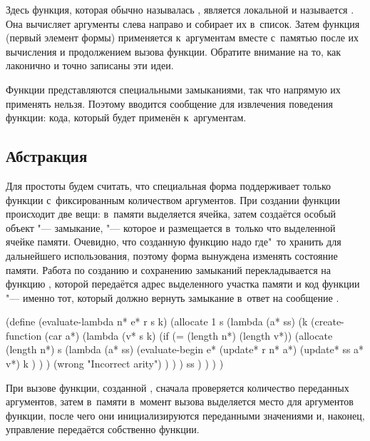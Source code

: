 Здесь функция, которая обычно называлась , является локальной и
называется . Она вычисляет аргументы слева направо и
собирает их в~список. Затем функция (первый элемент формы) применяется
к~аргументам вместе с~памятью после их вычисления и продолжением вызова функции.
Обратите внимание на то, как лаконично и точно записаны эти идеи.

Функции представляются специальными замыканиями, так что напрямую их применять
нельзя. Поэтому вводится сообщение  для извлечения поведения
функции: кода, который будет применён к~аргументам.


\subsection{Абстракция}\label{assignment/implementation/ssect:abstraction}

Для простоты будем считать, что специальная форма  поддерживает
только функции с~фиксированным количеством аргументов. При создании функции
происходит две вещи: в~памяти выделяется ячейка, затем создаётся особый объект
"--- замыкание, "--- которое и размещается в~только что выделенной ячейке
памяти. Очевидно, что созданную функцию надо где"~то хранить для дальнейшего
использования, поэтому форма  вынуждена изменять состояние памяти.
Работа по созданию и сохранению замыканий перекладывается на функцию
, которой передаётся адрес выделенного участка памяти и код
функции "--- именно тот, который должно вернуть замыкание в~ответ на сообщение
.

\begin{code:lisp}
(define (evaluate-lambda n* e* r s k)
  (allocate 1 s
    (lambda (a* ss)
      (k (create-function
          (car a*)
          (lambda (v* s k)
            (if (= (length n*) (length v*))
                (allocate (length n*) s
                  (lambda (a* ss)
                    (evaluate-begin e*
                                    (update* r  n* a*)
                                    (update* ss a* v*)
                                    k ) ) )
                (wrong "Incorrect arity") ) ) )
          ss ) ) ) )
\end{code:lisp}

При вызове функции, созданной , сначала проверяется количество
переданных аргументов, затем в~памяти в~момент вызова выделяется место для
аргументов функции, после чего они инициализируются переданными значениями и,
наконец, управление передаётся собственно функции.

